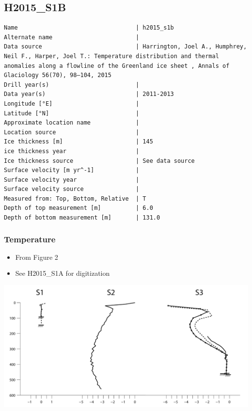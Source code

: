 \documentclass[article,a4paper,times,11pt,twoside]{article}
\begin{document}
\subsection{H2015\_S1B}
\label{sec:org125666f}
\begin{verbatim}
Name                                  | h2015_s1b
Alternate name                        | 
Data source                           | Harrington, Joel A., Humphrey, Neil F., Harper, Joel T.: Temperature distribution and thermal anomalies along a flowline of the Greenland ice sheet , Annals of Glaciology 56(70), 98–104, 2015 
Drill year(s)                         | 
Data year(s)                          | 2011-2013
Longitude [°E]                        | 
Latitude [°N]                         | 
Approximate location name             | 
Location source                       | 
Ice thickness [m]                     | 145
ice thickness year                    | 
Ice thickness source                  | See data source
Surface velocity [m yr^-1]            | 
Surface velocity year                 | 
Surface velocity source               | 
Measured from: Top, Bottom, Relative  | T
Depth of top measurement [m]          | 6.0
Depth of bottom measurement [m]       | 131.0
\end{verbatim}

\subsubsection{Temperature}
\label{sec:orga80fbfa}

\begin{itemize}
\item From \textcite{harrington_2015} Figure 2
\item See H2015\_S1A for digitization
\end{itemize}

\begin{center}
\includegraphics[width=.9\linewidth]{h2015_s1b/harrington_2015_fig2_S1_S2_S3.png}
\end{center}
\end{document}
